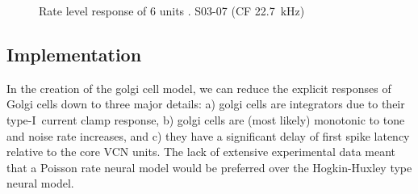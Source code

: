 \begin{figure}[htb]
  \centering
\caption{Rate level response of 6 units \citep[from~Fig.~2]{GhoshalKim:1997}. S03-07 (CF 22.7~kHz) }\label{fig:GolgiKimFig2}
\end{figure}


\clearpage
\subsection{Implementation}

In the creation of the golgi cell model, we can reduce the explicit
responses of Golgi cells down to three major details: a) golgi cells are integrators due to their type-I~current clamp response, b) golgi cells are (most likely) monotonic to tone and noise rate increases, and
c) they have a significant delay of first spike latency relative to the core VCN units. The lack of extensive experimental data meant that a Poisson rate neural model
would be preferred over the Hogkin-Huxley type neural model. 


